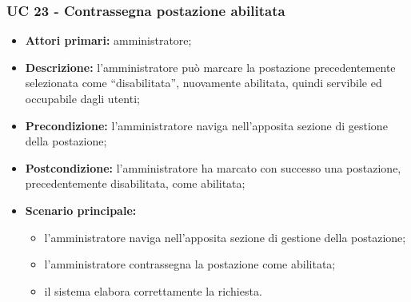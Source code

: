 
\subsubsection{UC 23 - Contrassegna postazione abilitata}

\begin{itemize}
\item \textbf{Attori primari:} amministratore;
\item \textbf{Descrizione:} l’amministratore può marcare la postazione precedentemente selezionata come “disabilitata”, nuovamente abilitata, quindi servibile ed occupabile dagli utenti;
\item \textbf{Precondizione:} l’amministratore naviga nell’apposita sezione di gestione della postazione; 
\item \textbf{Postcondizione:} l’amministratore ha marcato con successo una postazione, precedentemente disabilitata, come abilitata;
\item \textbf{Scenario principale:} 
	\begin{itemize}
		\item l’amministratore naviga nell’apposita sezione di gestione della postazione;
		\item l’amministratore contrassegna la postazione come abilitata;
		\item il sistema elabora correttamente la richiesta.
	\end{itemize}
\end{itemize}
